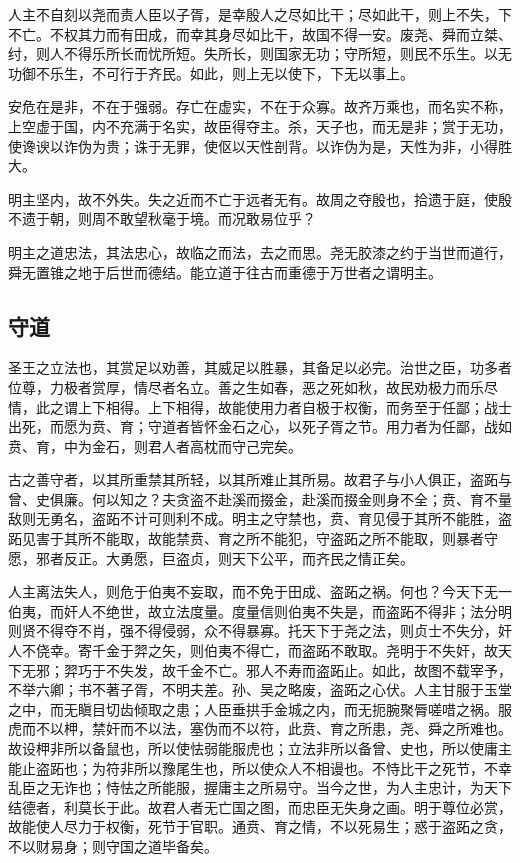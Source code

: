 \documentclass[]{article}
\begin{document}
人主不自刻以尧而责人臣以子胥，是幸殷人之尽如比干；尽如此干，则上不失，下不亡。不权其力而有田成，而幸其身尽如比干，故国不得一安。废尧、舜而立桀、纣，则人不得乐所长而忧所短。失所长，则国家无功；守所短，则民不乐生。以无功御不乐生，不可行于齐民。如此，则上无以使下，下无以事上。

安危在是非，不在于强弱。存亡在虚实，不在于众寡。故齐万乘也，而名实不称，上空虚于国，内不充满于名实，故臣得夺主。杀，天子也，而无是非；赏于无功，使谗谀以诈伪为贵；诛于无罪，使伛以天性剖背。以诈伪为是，天性为非，小得胜大。

明主坚内，故不外失。失之近而不亡于远者无有。故周之夺殷也，拾遗于庭，使殷不遗于朝，则周不敢望秋毫于境。而况敢易位乎？

明主之道忠法，其法忠心，故临之而法，去之而思。尧无胶漆之约于当世而道行，舜无置锥之地于后世而德结。能立道于往古而重德于万世者之谓明主。

\hypertarget{header-n1078}{%
\subsection{守道}\label{header-n1078}}

圣王之立法也，其赏足以劝善，其威足以胜暴，其备足以必完。治世之臣，功多者位尊，力极者赏厚，情尽者名立。善之生如春，恶之死如秋，故民劝极力而乐尽情，此之谓上下相得。上下相得，故能使用力者自极于权衡，而务至于任鄙；战士出死，而愿为贲、育；守道者皆怀金石之心，以死子胥之节。用力者为任鄙，战如贲、育，中为金石，则君人者高枕而守己完矣。

古之善守者，以其所重禁其所轻，以其所难止其所易。故君子与小人俱正，盗跖与曾、史俱廉。何以知之？夫贪盗不赴溪而掇金，赴溪而掇金则身不全；贲、育不量敌则无勇名，盗跖不计可则利不成。明主之守禁也，贲、育见侵于其所不能胜，盗跖见害于其所不能取，故能禁贲、育之所不能犯，守盗跖之所不能取，则暴者守愿，邪者反正。大勇愿，巨盗贞，则天下公平，而齐民之情正矣。

人主离法失人，则危于伯夷不妄取，而不免于田成、盗跖之祸。何也？今天下无一伯夷，而奸人不绝世，故立法度量。度量信则伯夷不失是，而盗跖不得非；法分明则贤不得夺不肖，强不得侵弱，众不得暴寡。托天下于尧之法，则贞士不失分，奸人不侥幸。寄千金于羿之矢，则伯夷不得亡，而盗跖不敢取。尧明于不失奸，故天下无邪；羿巧于不失发，故千金不亡。邪人不寿而盗跖止。如此，故图不载宰予，不举六卿；书不著子胥，不明夫差。孙、吴之略废，盗跖之心伏。人主甘服于玉堂之中，而无瞋目切齿倾取之患；人臣垂拱手金城之内，而无扼腕聚脣嗟唶之祸。服虎而不以柙，禁奸而不以法，塞伪而不以符，此贲、育之所患，尧、舜之所难也。故设柙非所以备鼠也，所以使怯弱能服虎也；立法非所以备曾、史也，所以使庸主能止盗跖也；为符非所以豫尾生也，所以使众人不相谩也。不恃比干之死节，不幸乱臣之无诈也；恃怯之所能服，握庸主之所易守。当今之世，为人主忠计，为天下结德者，利莫长于此。故君人者无亡国之图，而忠臣无失身之画。明于尊位必赏，故能使人尽力于权衡，死节于官职。通贲、育之情，不以死易生；惑于盗跖之贪，不以财易身；则守国之道毕备矣。
\end{document}
